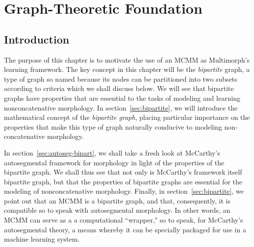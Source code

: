 \chapter{Graph-Theoretic Foundation}
\label{ch:graph}
\section{Introduction}
The purpose of this chapter is to motivate the use of an \ac{MCMM} as Multimorph's 
learning framework. The key concept in this chapter will be the \emph{bipartite} graph, 
a type of graph so named because its nodes can be partitioned into two subsets according 
to criteria which we shall discuss below. 
We will see that bipartite graphs have properties that are essential 
to the tasks of modeling and learning nonconcatenative morphology.
In section~\ref{sec:bipartite}, we will introduce the mathematical concept of the 
\emph{bipartite graph}, placing particular importance on the properties that make this type 
of graph naturally conducive to modeling non-concatenative morphology. %

In section~\ref{sec:autoseg-bipart}, we shall take a fresh look at McCarthy's 
autosegmental framework for morphology \citep{mccarthy:1981} in light of the 
properties of the bipartite graph. We shall thus see that not only is McCarthy's 
framework itself bipartite graph, but that the properties of bipartite graphs are essential 
for the modeling of nonconcatenative morphology.
Finally, in section~\ref{sec:bipartite}, we point out that an \ac{MCMM} is a bipartite graph, 
and that, consequently, it is compatible so to  speak with autosegmental morphology. 
In other words, an MCMM can serve as a
a computational ``wrapper," so to speak, for McCarthy's autosegmental theory, a 
means whereby it can be specially packaged for use in a machine learning system. 
 
